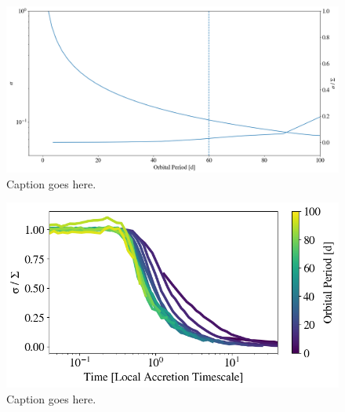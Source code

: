 \documentclass[twocolumn]{aastex63}
\begin{document}
\begin{figure}
\begin{center}
    \includegraphics[width=\textwidth]{figures/alpha_pl_frac.png}
    \caption{Caption goes here.\label{fig:alpha_pl_frac}}
\end{center}
\end{figure}

\begin{figure}
\begin{center}
    \includegraphics[width=\textwidth]{figures/pl_frac_time.png}
    \caption{Caption goes here.\label{fig:pl_frac_time}}
\end{center}
\end{figure}
\end{document}
